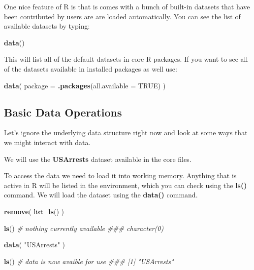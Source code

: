 \documentclass[]{book}
\newenvironment{Shaded}{\begin{snugshade}}{\end{snugshade}}
\newcommand{\CommentTok}[1]{\textcolor[rgb]{0.56,0.35,0.01}{\textit{#1}}}
\newcommand{\DataTypeTok}[1]{\textcolor[rgb]{0.13,0.29,0.53}{#1}}
\newcommand{\KeywordTok}[1]{\textcolor[rgb]{0.13,0.29,0.53}{\textbf{#1}}}
\newcommand{\NormalTok}[1]{#1}
\newcommand{\OtherTok}[1]{\textcolor[rgb]{0.56,0.35,0.01}{#1}}
\newcommand{\StringTok}[1]{\textcolor[rgb]{0.31,0.60,0.02}{#1}}
\theoremstyle{definition}
\theoremstyle{definition}
\theoremstyle{definition}
\theoremstyle{remark}
\begin{document}
One nice feature of R is that is comes with a bunch of built-in datasets
that have been contributed by users are are loaded automatically. You
can see the list of available datasets by typing:

\begin{Shaded}
\begin{Highlighting}[]
\KeywordTok{data}\NormalTok{()}
\end{Highlighting}
\end{Shaded}

This will list all of the default datasets in core R packages. If you
want to see all of the datasets available in installed packages as well
use:

\begin{Shaded}
\begin{Highlighting}[]
\KeywordTok{data}\NormalTok{( }\DataTypeTok{package =} \KeywordTok{.packages}\NormalTok{(}\DataTypeTok{all.available =} \OtherTok{TRUE}\NormalTok{) )}
\end{Highlighting}
\end{Shaded}

\hypertarget{basic-data-operations}{%
\subsection{Basic Data Operations}\label{basic-data-operations}}

Let's ignore the underlying data structure right now and look at some
ways that we might interact with data.

We will use the \textbf{USArrests} dataset available in the core files.

To access the data we need to load it into working memory. Anything that
is active in R will be listed in the environment, which you can check
using the \textbf{ls()} command. We will load the dataset using the
\textbf{data()} command.

\begin{Shaded}
\begin{Highlighting}[]
\KeywordTok{remove}\NormalTok{( }\DataTypeTok{list=}\KeywordTok{ls}\NormalTok{() )}
\end{Highlighting}
\end{Shaded}

\begin{Shaded}
\begin{Highlighting}[]

\KeywordTok{ls}\NormalTok{() }\CommentTok{# nothing currently available}
\CommentTok{### character(0)}

\KeywordTok{data}\NormalTok{( }\StringTok{"USArrests"}\NormalTok{ )}

\KeywordTok{ls}\NormalTok{() }\CommentTok{# data is now avaible for use}
\CommentTok{### [1] "USArrests"}
\end{Highlighting}
\end{Shaded}
\end{document}
